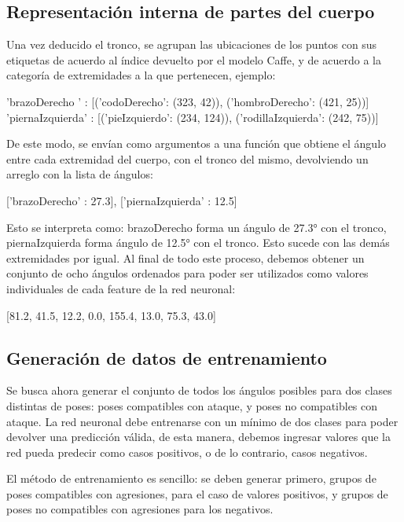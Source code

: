 \documentclass[a4paper,12pt,oneside,spanish]{book}
\begin{document}
\subsection{Representación interna de partes del cuerpo}
Una vez deducido el tronco, se agrupan las ubicaciones de los puntos con sus etiquetas de acuerdo al índice devuelto por el modelo Caffe, y de acuerdo a la categoría de extremidades a la que pertenecen, ejemplo:
\begin{center}
{\footnotesize 'brazoDerecho  ' : [('codoDerecho': (323, 42)),  ('hombroDerecho': (421, 25))]}  \\
{\footnotesize 'piernaIzquierda' : [('pieIzquierdo': (234, 124)), ('rodillaIzquierda': (242, 75))]}\\	
\end{center}

De este modo, se envían como argumentos a una función que obtiene el ángulo entre cada extremidad del cuerpo, con el tronco del mismo, devolviendo un arreglo con la lista de ángulos:
\begin{center}
	{\footnotesize ['brazoDerecho' : 27.3], ['piernaIzquierda' : 12.5]}\\	
\end{center}
Esto se interpreta como: brazoDerecho forma un ángulo de 27.3° con el tronco, piernaIzquierda forma ángulo de 12.5° con el tronco. Esto sucede con las demás extremidades por igual. Al final de todo este proceso, debemos obtener un conjunto de ocho ángulos ordenados para poder ser utilizados como valores individuales de cada feature de la red neuronal:
\begin{center}
	{\footnotesize [81.2, 41.5, 12.2, 0.0, 155.4, 13.0, 75.3, 43.0]}\\	
\end{center}

\subsection{Generación de datos de entrenamiento}
Se busca ahora generar el conjunto de todos los ángulos posibles para dos clases distintas de poses: poses compatibles con ataque, y poses no compatibles con ataque. La red neuronal debe entrenarse con un mínimo de dos clases para poder devolver una predicción válida, de esta manera, debemos ingresar valores que la red pueda predecir como casos positivos, o de lo contrario, casos negativos.\par

El método de entrenamiento es sencillo: se deben generar primero, grupos de poses compatibles con agresiones, para el caso de valores positivos, y grupos de poses no compatibles con agresiones para los negativos.\par
\end{document}
